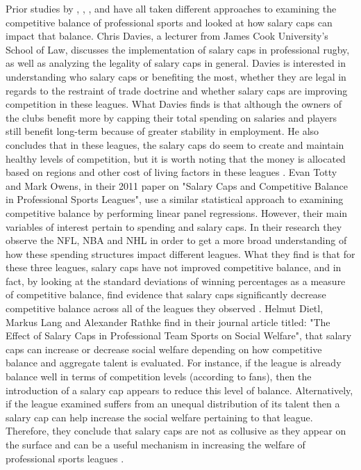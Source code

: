\documentclass[12pt,english]{article}
\begin{document}
 Prior studies by \cite{davies}, \cite{owens}, \cite{helmut}, \cite{zimmer} and \cite{vrooman} have all taken different approaches to examining the competitive balance of professional sports and looked at how salary caps can impact that balance. 
 \newline
 Chris Davies, a lecturer from James Cook University's School of Law, discusses the implementation of salary caps in professional rugby, as well as analyzing the legality of salary caps in general. Davies is interested in understanding who salary caps or benefiting the most, whether they are legal in regards to the restraint of trade doctrine and whether salary caps are improving competition in these leagues. What Davies finds is that although the owners of the clubs benefit more by capping their total spending on salaries and players still benefit long-term because of greater stability in employment. He also concludes that in these leagues, the salary caps do seem to create and maintain healthy levels of competition, but it is worth noting that the money is allocated based on regions and other cost of living factors in these leagues \cite{davies}. 
 \newline
 Evan Totty and Mark Owens, in their 2011 paper on "Salary Caps and Competitive Balance in Professional Sports Leagues", use a similar statistical approach to examining competitive balance by performing linear panel regressions. However, their main variables of interest pertain to spending and salary caps. In their research they observe the NFL, NBA and NHL in order to get a more broad understanding of how these spending structures impact different leagues. What they find is that for these three leagues, salary caps have not improved competitive balance, and in fact, by looking at the standard deviations of winning percentages as a measure of competitive balance, find evidence that salary caps significantly decrease competitive balance across all of the leagues they observed \cite{owens}. 
 \newline
 Helmut Dietl, Markus Lang and Alexander Rathke find in their journal article titled: "The Effect of Salary Caps in Professional Team Sports on Social Welfare", that salary caps can increase or decrease social welfare depending on how competitive balance and aggregate talent is evaluated. For instance, if the league is already balance well in terms of competition levels (according to fans), then the introduction of a salary cap appears to reduce this level of balance. Alternatively, if the league examined suffers from an unequal distribution of its talent then a salary cap can help increase the social welfare pertaining to that league. Therefore, they conclude that salary caps are not as collusive as they appear on the surface and can be a useful mechanism in increasing the welfare of professional sports leagues \cite{helmut}. 
\end{document}
